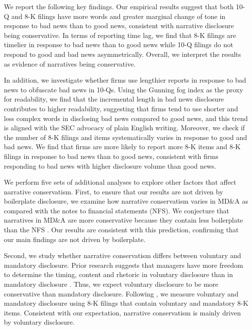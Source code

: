 \documentclass[letterpaper,12pt]{article}
\begin{document}
\begin{spacing}{1.5}
We report the following key findings. Our empirical results suggest that both 10-Q and 8-K filings have more words and greater marginal change of tone in response to bad news than to good news, consistent with narrative disclosure being conservative. In terms of reporting time lag, we find that 8-K filings are timelier in response to bad news than to good news while 10-Q filings do not respond to good and bad news asymmetrically. Overall, we interpret the results as evidence of narratives being conservative.

In addition, we investigate whether firms use lengthier reports in response to bad news to obfuscate bad news in 10-Qs. Using the Gunning fog index as the proxy for readability, we find that the incremental length in bad news disclosure contributes to higher readability, suggesting that firms tend to use shorter and less complex words in disclosing bad news compared to good news, and this trend is aligned with the SEC advocacy of plain English writing. Moreover, we check if the number of 8-K filings and items systematically varies in response to good and bad news. We find that firms are more likely to report more 8-K items and 8-K filings in response to bad news than to good news, consistent with firms responding to bad news with higher disclosure volume than good news.

We perform five sets of additional analyses to explore other factors that affect narrative conservatism. First, to ensure that our results are not driven by boilerplate disclosure, we examine how narrative conservatism varies in MD\&A as compared with the notes to financial statements (NFS). We conjecture that narratives in MD\&A are more conservative because they contain less boilerplate than the NFS \cite{secFinancialReportingManual2019}. Our results are consistent with this prediction, confirming that our main findings are not driven by boilerplate. 

Second, we study whether narrative conservatism differs between voluntary and mandatory disclosure. Prior research suggests that managers have more freedom to determine the timing, content and rhetoric in voluntary disclosure than in mandatory disclosure \cite{segalAreManagersStrategic2016}. Thus, we expect voluntary disclosure to be more conservative than mandatory disclosure. Following , we measure voluntary and mandatory disclosure using 8-K filings that contain voluntary and mandatory 8-K items. Consistent with our expectation, narrative conservatism is mainly driven by voluntary disclosure. 


\end{spacing}
\end{document}
